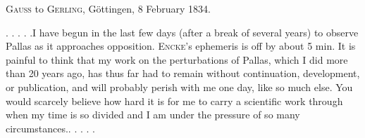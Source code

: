\par{}\bigskip
\begin{center}
\textsc{Gauss} to \textsc{Gerling}, Göttingen, 8 February 1834.
\end{center}
\noindent\hspace*{\parindent}. . . . .\quad I have begun in the last few days (after a break of several years) to observe Pallas as it approaches opposition. \textsc{Encke}'s ephemeris is off by about 5 min. It is painful to think that my work on the perturbations of Pallas, which I did more than 20 years ago, has thus far had to remain without continuation, development, or publication, and will probably perish with me one day, like so much else. You would scarcely believe how hard it is for me to carry a scientific work through when my time is so divided and I am under the pressure of so many circumstances.\quad . . . . .
\par
